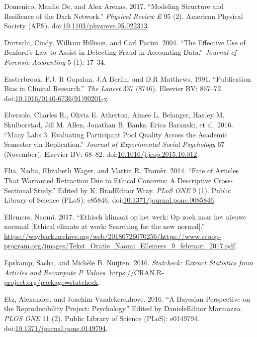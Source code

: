 \documentclass[a5paper]{book}
\begin{document}
\hypertarget{ref-doi:10.1103ux2fphysreve.95.022313}{}
Domenico, Manlio De, and Alex Arenas. 2017. ``Modeling Structure and
Resilience of the Dark Network.'' \emph{Physical Review E} 95 (2).
American Physical Society (APS).
doi:\href{https://doi.org/10.1103/physreve.95.022313}{10.1103/physreve.95.022313}.

\hypertarget{ref-durtschi2004effective}{}
Durtschi, Cindy, William Hillison, and Carl Pacini. 2004. ``The
Effective Use of Benford's Law to Assist in Detecting Fraud in
Accounting Data.'' \emph{Journal of Forensic Accounting} 5 (1): 17--34.

\hypertarget{ref-doi:10.1016ux2f0140-6736_91_90201-y}{}
Easterbrook, P.J, R Gopalan, J.A Berlin, and D.R Matthews. 1991.
``Publication Bias in Clinical Research.'' \emph{The Lancet} 337 (8746).
Elsevier BV: 867--72.
doi:\href{https://doi.org/10.1016/0140-6736(91)90201-y}{10.1016/0140-6736(91)90201-y}.

\hypertarget{ref-doi:10.1016ux2fj.jesp.2015.10.012}{}
Ebersole, Charles R., Olivia E. Atherton, Aimee L. Belanger, Hayley M.
Skulborstad, Jill M. Allen, Jonathan B. Banks, Erica Baranski, et al.
2016. ``Many Labs 3: Evaluating Participant Pool Quality Across the
Academic Semester via Replication.'' \emph{Journal of Experimental
Social Psychology} 67 (November). Elsevier BV: 68--82.
doi:\href{https://doi.org/10.1016/j.jesp.2015.10.012}{10.1016/j.jesp.2015.10.012}.

\hypertarget{ref-doi:10.1371ux2fjournal.pone.0085846}{}
Elia, Nadia, Elizabeth Wager, and Martin R. Tramèr. 2014. ``Fate of
Articles That Warranted Retraction Due to Ethical Concerns: A
Descriptive Cross-Sectional Study.'' Edited by K. BradEditor Wray.
\emph{PLoS ONE} 9 (1). Public Library of Science (PLoS): e85846.
doi:\href{https://doi.org/10.1371/journal.pone.0085846}{10.1371/journal.pone.0085846}.

\hypertarget{ref-ellemers}{}
Ellemers, Naomi. 2017. ``Ethisch klimaat op het werk: Op zoek naar het
nieuwe normaal {[}Ethical climate at work: Searching for the new
normal{]}.''
\url{https://wayback.archive.org/web/20180726070256/https://www.scoop-program.org/images/Tekst_Oratie_Naomi_Ellemers_9_februari_2017.pdf}.

\hypertarget{ref-statcheck}{}
Epskamp, Sacha, and Michèle B. Nuijten. 2016. \emph{Statcheck: Extract
Statistics from Articles and Recompute P Values}.
\url{https://CRAN.R-project.org/package=statcheck}.

\hypertarget{ref-doi:10.1371ux2fjournal.pone.0149794}{}
Etz, Alexander, and Joachim Vandekerckhove. 2016. ``A Bayesian
Perspective on the Reproducibility Project: Psychology.'' Edited by
DanieleEditor Marinazzo. \emph{PLOS ONE} 11 (2). Public Library of
Science (PLoS): e0149794.
doi:\href{https://doi.org/10.1371/journal.pone.0149794}{10.1371/journal.pone.0149794}.
\end{document}
